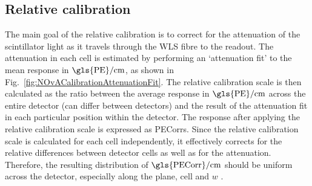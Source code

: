 \subsection{Relative calibration}\label{secRelativCalibration}



The main goal of the relative calibration is to correct for the attenuation of the scintillator light as it travels through the \gls{WLS} fibre to the readout. The attenuation in each cell is estimated by performing an `attenuation fit' to the mean response in $\unit{\gls{PE}/cm}$, as shown in Fig.~\ref{fig:NOvACalibrationAttenuationFit}. The relative calibration scale is then calculated as the ratio between the average response in $\unit{\gls{PE}/cm}$ across the entire detector (can differ between detectors) and the result of the attenuation fit in each particular position within the detector. The response after applying the relative calibration scale is expressed as \glspl{PECorr}. Since the relative calibration scale is calculated for each cell independently, it effectively corrects for the relative differences between detector cells as well as for the attenuation. Therefore, the resulting distribution of $\unit{\gls{PECorr}/cm}$ should be uniform across the detector, especially along the plane, cell and $w$ \cite{PrabhjotNOvAThesis_CalibrationAndOscResults2019.pdf}.


